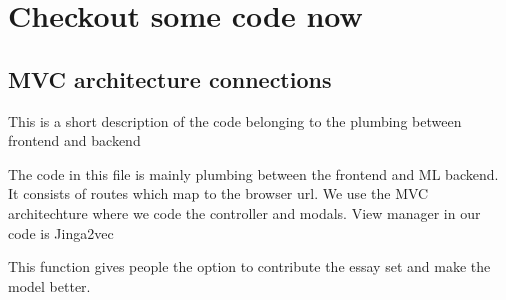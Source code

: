 \documentclass[letterpaper,10pt,english]{sphinxmanual}
\begin{document}
\begin{sphinxVerbatim}[commandchars=\\\{\}]
 
\end{sphinxVerbatim}


\chapter{Checkout some code now}
\label{\detokenize{index:checkout-some-code-now}}

\section{MVC architecture connections}
\label{\detokenize{main:mvc-architecture-connections}}\label{\detokenize{main::doc}}
This is a short description of the code belonging to the plumbing between frontend and backend

The code in this file is mainly plumbing between the frontend and ML backend. It consists of routes which map to the browser url. We use the MVC architechture where we code the controller and modals. View manager in our code is Jinga2vec

\label{\detokenize{main:module-main}}

\begin{fulllineitems}
\label{\detokenize{main:main.contrbPage}}
This function gives people the option to contribute the essay set and make the model better.

\begin{sphinxVerbatim}[commandchars=\\\{\}]
                   
\end{sphinxVerbatim}

\begin{sphinxVerbatim}[commandchars=\\\{\}]
 
\end{sphinxVerbatim}

\end{fulllineitems}
\end{document}
